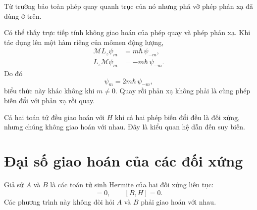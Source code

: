 Từ trường bảo toàn phép quay quanh trục của nó nhưng phá vỡ phép phản xạ đã dùng ở trên.

\begin{classroomqa}
\end{classroomqa}

Có thể thấy trực tiếp tính không giao hoán của phép quay và phép phản xạ. Khi tác dụng lên một hàm riêng của mômen động lượng,
\begin{align}
\mathcal M L_z\psi_m
&=m\hbar\,\psi_{-m},\\
L_z\mathcal M\psi_m
&=-m\hbar\,\psi_{-m}.
\end{align}
Do đó
\begin{equation}
[\mathcal M,L_z]\psi_m
=2m\hbar\,\psi_{-m},
\end{equation}
biểu thức này khác không khi \(m\neq0\). Quay rồi phản xạ không phải là cùng phép biến đổi với phản xạ rồi quay.

Cả hai toán tử đều giao hoán với \(H\) khi cả hai phép biến đổi đều là đối xứng, nhưng chúng không giao hoán với nhau. Đây là kiểu quan hệ dẫn đến suy biến.

\begin{classroomqa}
\end{classroomqa}

\section{Đại số giao hoán của các đối xứng}

Giả sử \(A\) và \(B\) là các toán tử sinh Hermite của hai đối xứng liên tục:
\begin{equation}
[A,H]=0,
\qquad
[B,H]=0.
\end{equation}
Các phương trình này không đòi hỏi \(A\) và \(B\) phải giao hoán với nhau.

